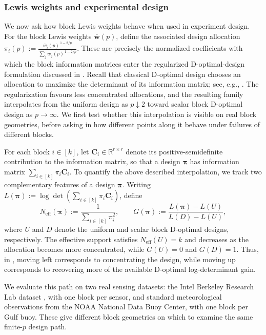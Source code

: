 \documentclass[11pt]{article}
\theoremstyle{plain}
\numberwithin{equation}{section}
\newcommand{\bC}{\mathbf{C}}
\newcommand{\bwbar}{\overline{\mathbf{w}}}
\newcommand{\bpi}{\bm{\pi}}
\begin{document}
\subsubsection{Lewis weights and experimental design}
\label{sec:expts-design-geometry}
We now ask how block Lewis weights behave when used in experiment design. For the block Lewis weights $\bwbar(p)$, define the associated design allocation $
    \pi_i(p)
    :=
    \frac{\bar w_i(p)^{\,1-2/p}}
         {\sum_j \bar w_j(p)^{\,1-2/p}}.
$ 
These are precisely the normalized coefficients with which the block information matrices enter the regularized D-optimal-design formulation discussed in . Recall that classical D-optimal design chooses an allocation to maximize the determinant of its information matrix; see, e.g., \cite{pukelsheim2006optimal}. The regularization favours less
concentrated allocations, and the resulting family interpolates from the
uniform design as $p\downarrow2$ toward scalar block D-optimal design as
$p\to\infty$. We first test whether this interpolation is visible on real
block geometries, before asking in  how different
points along it behave under failures of different blocks. 

For each block $i\in[k]$, let $\bC_i\in\mathbb R^{r\times r}$ denote its positive-semidefinite contribution to the information matrix, so that a design $\bpi$ has information matrix $\sum_{i\in[k]}\pi_i\bC_i$. To quantify the above described interpolation, we track two complementary features of a design $\bpi$. Writing $L(\bpi):=\log\det\left(\sum_{i\in [k]} \pi_i \bC_i\right)$, define 
\[
    N_{\mathrm{eff}}(\bpi):=\frac{1}{\sum_{i\in[k]}\pi_i^2},
    \qquad
    G(\bpi):=\frac{L(\bpi)-L(U)}{L(D)-L(U)},
\]
where $U$ and $D$ denote the uniform and scalar block D-optimal designs, respectively. The effective support satisfies $N_{\mathrm{eff}}(U)=k$ and decreases as the allocation becomes more concentrated, while $G(U)=0$ and $G(D)=1$. Thus, in , moving left corresponds to concentrating the design, while moving up corresponds to recovering more of the available D-optimal log-determinant gain.

We evaluate this path on two real sensing datasets: the Intel Berkeley
Research Lab dataset \cite{guestrin2004distributed}, with one block per
sensor, and standard meteorological observations from the NOAA National
Data Buoy Center, with one block per Gulf buoy. These give
different block geometries on which to examine the same finite-$p$ design
path.
\end{document}
